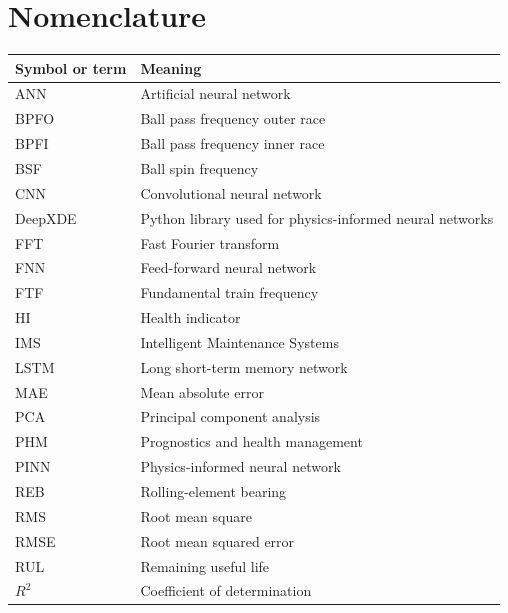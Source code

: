 \chapter*{Nomenclature}

\begin{tabularx}{\textwidth}{@{}lX@{}}
\toprule
\textbf{Symbol or term} & \textbf{Meaning} \\
\midrule
ANN & Artificial neural network \\
BPFO & Ball pass frequency outer race \\
BPFI & Ball pass frequency inner race \\
BSF & Ball spin frequency \\
CNN & Convolutional neural network \\
DeepXDE & Python library used for physics-informed neural networks \\
FFT & Fast Fourier transform \\
FNN & Feed-forward neural network \\
FTF & Fundamental train frequency \\
HI & Health indicator \\
IMS & Intelligent Maintenance Systems \\
LSTM & Long short-term memory network \\
MAE & Mean absolute error \\
PCA & Principal component analysis \\
PHM & Prognostics and health management \\
PINN & Physics-informed neural network \\
REB & Rolling-element bearing \\
RMS & Root mean square \\
RMSE & Root mean squared error \\
RUL & Remaining useful life \\
$R^2$ & Coefficient of determination \\
\bottomrule
\end{tabularx}
